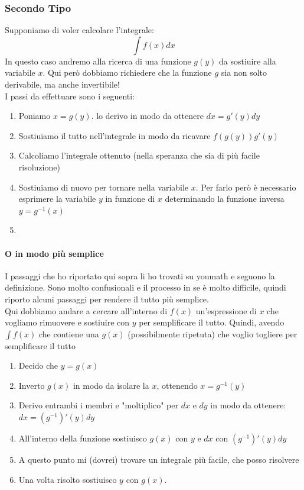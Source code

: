 \documentclass[12pt, a4paper, openany]{book}
\begin{document}
\subsubsection*{Secondo Tipo}
Supponiamo di voler calcolare l'integrale: $$\int f(x)dx$$
In questo caso andremo alla ricerca di una funzione $g(y)$ da sostiuire alla variabile $x$.
Qui però dobbiamo richiedere che la funzione $g$ sia non solto derivabile, ma anche invertibile!
\\I passi da effettuare sono i seguenti:
\begin{enumerate}
	\item Poniamo $x=g(y)$. lo derivo in modo da ottenere $dx=g'(y)dy$
	\item Sostiuiamo il tutto nell'integrale in modo da ricavare $f(g(y))g'(y)$
	\item Calcoliamo l'integrale ottenuto (nella speranza che sia di più facile risoluzione)
	\item Sostiuiamo di nuovo per tornare nella variabile $x$. Per farlo però è necessario esprimere la variabile $y$ in funzione di $x$ determinando la funzione inversa $y=g^{-1}(x)$
	\item 
\end{enumerate}
\paragraph*{O in modo più semplice}
I passaggi che ho riportato qui sopra li ho trovati su youmath e seguono la definizione.
Sono molto confusionali e il processo in se è molto difficile, quindi riporto alcuni passaggi per rendere il tutto più semplice.
\\Qui dobbiamo andare a cercare all'interno di $f(x)$ un'espressione di $x$ che vogliamo rimuovere e sostiuire con $y$ per semplificare il tutto.
Quindi, avendo $\int f(x)$ che contiene una $g(x)$ (possibilmente ripetuta) che voglio togliere per semplificare il tutto
\begin{enumerate}
	\item Decido che $y=g(x)$
	\item Inverto $g(x)$ in modo da isolare la $x$, ottenendo $x=g^{-1}(y)$
	\item Derivo entrambi i membri e "moltiplico" per $dx$ e $dy$ in modo da ottenere: $dx=(g^{-1})'(y)dy$
	\item All'interno della funzione sostiuisco $g(x)$ con $y$ e $dx$ con $(g^{-1})'(y)dy$
	\item A questo punto mi (dovrei) trovare un integrale più facile, che posso risolvere
	\item Una volta risolto sostiuisco $y$ con $g(x)$.
\end{enumerate}
\end{document}

